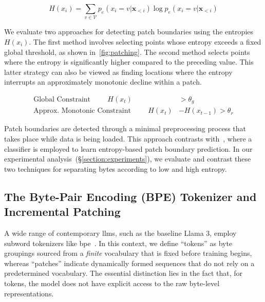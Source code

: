 \begin{equation}
H(x_i) = \sum_{v \in \mathcal{V}} p_{e}(x_i=v|\pmb{x}_{<i}) \log p_{e}(x_i=v|\pmb{x}_{<i})
\end{equation}

We evaluate two approaches for detecting patch boundaries using the entropies $H(x_i)$. The first method involves selecting points whose entropy exceeds a fixed global threshold, as shown in~\autoref{fig:patching}. The second method selects points where the entropy is significantly higher compared to the preceding value. This latter strategy can also be viewed as finding locations where the entropy interrupts an approximately monotonic decline within a patch.

\begin{align*}
    \text{Global Constraint}\hspace{1cm}H(x_t)& > \theta_g\\
    \text{Approx. Monotonic Constraint}\hspace{1cm}H(x_t)& - H(x_{t-1}) > \theta_r
\end{align*}

Patch boundaries are detected through a minimal preprocessing process that takes place while data is being loaded. This approach contrasts with~\citet{nawrot-etal-2023-efficient}, where a classifier is employed to learn entropy-based patch boundary prediction. In our experimental analysis~(\S\ref{section:experiments}), we evaluate and contrast these two techniques for separating bytes according to low and high entropy.

\subsection{The Byte-Pair Encoding (BPE) Tokenizer and Incremental Patching}
\label{section:incremental-patching}
\label{section:bpe-patch}

A wide range of contemporary llms, such as the baseline Llama 3, employ subword tokenizers like bpe~\citep{gage1994new, sennrich-etal-2016-neural}. In this context, we define ``tokens'' as byte groupings sourced from a \textit{finite} vocabulary that is fixed before training begins, whereas ``patches'' indicate dynamically formed sequences that do not rely on a predetermined vocabulary. The essential distinction lies in the fact that, for tokens, the model does not have explicit access to the raw byte-level representations.


